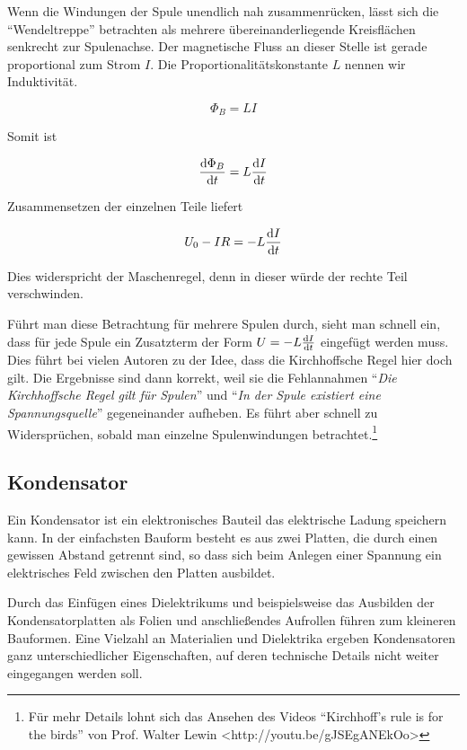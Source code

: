 \documentclass[a4paper,german,12pt,smallheadings]{scrartcl}
\begin{document}
Wenn die Windungen der Spule unendlich nah zusammenrücken, lässt sich die
``Wendeltreppe'' betrachten als mehrere übereinanderliegende Kreisflächen
senkrecht zur Spulenachse. Der magnetische Fluss an dieser Stelle ist gerade
proportional zum Strom $I$. Die Proportionalitätskonstante $L$ nennen wir
Induktivität.

\begin{equation}
  \Phi_B = L I
\end{equation}

Somit ist

\begin{equation}
  \frac{\dif \Phi_B}{\dif t} = L \frac{\dif I}{\dif t}
\end{equation}

Zusammensetzen der einzelnen Teile liefert

\begin{equation}
  U_0 - IR = -L \frac{\dif I}{\dif t}
\end{equation}

Dies widerspricht der Maschenregel, denn in dieser würde der rechte Teil
verschwinden.

Führt man diese Betrachtung für mehrere Spulen durch, sieht man schnell ein,
dass für jede Spule ein Zusatzterm der Form $U = -L \frac{\dif I}{\dif t}$
eingefügt werden muss. Dies führt bei vielen Autoren zu der Idee, dass die
Kirchhoffsche Regel hier doch gilt. Die Ergebnisse sind dann korrekt, weil sie
die Fehlannahmen ``\textit{Die Kirchhoffsche Regel gilt für Spulen}'' und
``\textit{In der Spule existiert eine Spannungsquelle}'' gegeneinander
aufheben. Es führt aber schnell zu Widersprüchen, sobald man einzelne
Spulenwindungen betrachtet.\footnote{Für mehr Details lohnt sich das Ansehen
des Videos ``Kirchhoff's rule is for the birds'' von Prof. Walter Lewin
<http://youtu.be/gJSEgANEkOo>}


\subsection{Kondensator}


Ein Kondensator ist ein elektronisches Bauteil das elektrische Ladung speichern
kann. In der einfachsten Bauform besteht es aus zwei Platten, die durch einen
gewissen Abstand getrennt sind, so dass sich beim Anlegen einer Spannung ein
elektrisches Feld zwischen den Platten ausbildet.

Durch das Einfügen eines Dielektrikums und beispielsweise das Ausbilden der
Kondensatorplatten als Folien und anschließendes Aufrollen führen zum kleineren
Bauformen. Eine Vielzahl an Materialien und Dielektrika ergeben Kondensatoren
ganz unterschiedlicher Eigenschaften, auf deren technische Details nicht weiter
eingegangen werden soll.
\end{document}
